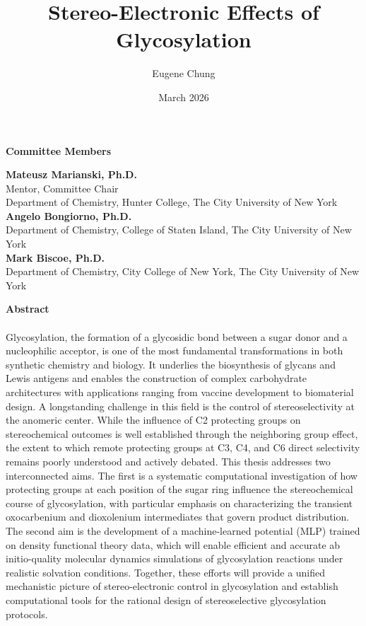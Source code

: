 \documentclass{article}
\title{Stereo-Electronic Effects of Glycosylation}
\author[1,2]{Eugene Chung}
\affil[1]{Department of Chemistry, Hunter College, The City University of New York}
\affil[2]{The Ph.D. Program in Chemistry, The Graduate Center, The City University of New York}
\date{March 2026}
\begin{document}
\maketitle
\newpage
\begin{center}
    \Large \textbf{Committee Members}  
\end{center}
\vspace{0.5cm}

\noindent \large \textbf{Mateusz Marianski, Ph.D.} \\
Mentor, Committee Chair \\
Department of Chemistry, Hunter College, The City University of New York \\

\noindent \large \textbf{Angelo Bongiorno, Ph.D.} \\
Department of Chemistry, College of Staten Island, The City University of New York \\

\noindent \large \textbf{Mark Biscoe, Ph.D.} \\
Department of Chemistry, City College of New York, The City University of New York \\
\newpage

{\Large\bfseries Abstract}\\
\\
Glycosylation, the formation of a glycosidic bond between a sugar donor and a nucleophilic acceptor, is one of the most fundamental transformations in both synthetic chemistry and biology. It underlies the biosynthesis of glycans and Lewis antigens and enables the construction of complex carbohydrate architectures with applications ranging from vaccine development to biomaterial design. A longstanding challenge in this field is the control of stereoselectivity at the anomeric center. While the influence of C2 protecting groups on stereochemical outcomes is well established through the neighboring group effect, the extent to which remote protecting groups at C3, C4, and C6 direct selectivity remains poorly understood and actively debated. This thesis addresses two interconnected aims. The first is a systematic computational investigation of how protecting groups at each position of the sugar ring influence the stereochemical course of glycosylation, with particular emphasis on characterizing the transient oxocarbenium and dioxolenium intermediates that govern product distribution. The second aim is the development of a machine-learned potential (MLP) trained on density functional theory data, which will enable efficient and accurate ab initio-quality molecular dynamics simulations of glycosylation reactions under realistic solvation conditions. Together, these efforts will provide a unified mechanistic picture of stereo-electronic control in glycosylation and establish computational tools for the rational design of stereoselective glycosylation protocols.
\newpage
\tableofcontents
\newpage
\end{document}
